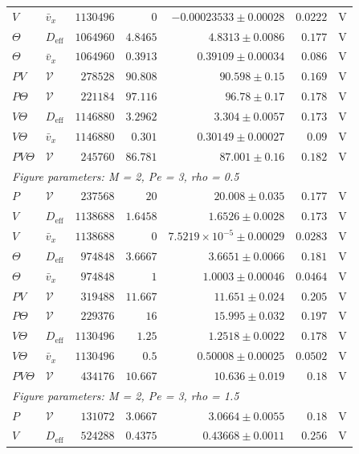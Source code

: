 \begin{longtable}{llrrrrc}
$V$ & $\bar v_x$ & $1130496$ & $0$ & $-0.00023533 \pm 0.00028$ & $0.0222$ & V \\
$\Theta$ & $D_{\mathrm{eff}}$ & $1064960$ & $4.8465$ & $4.8313 \pm 0.0086$ & $0.177$ & V \\
$\Theta$ & $\bar v_x$ & $1064960$ & $0.3913$ & $0.39109 \pm 0.00034$ & $0.086$ & V \\
$PV$ & $\mathcal V$ & $278528$ & $90.808$ & $90.598 \pm 0.15$ & $0.169$ & V \\
$P\Theta$ & $\mathcal V$ & $221184$ & $97.116$ & $96.78 \pm 0.17$ & $0.178$ & V \\
$V\Theta$ & $D_{\mathrm{eff}}$ & $1146880$ & $3.2962$ & $3.304 \pm 0.0057$ & $0.173$ & V \\
$V\Theta$ & $\bar v_x$ & $1146880$ & $0.301$ & $0.30149 \pm 0.00027$ & $0.09$ & V \\
$PV\Theta$ & $\mathcal V$ & $245760$ & $86.781$ & $87.001 \pm 0.16$ & $0.182$ & V \\
\multicolumn{7}{l}{\textit{Figure parameters: M = 2, Pe = 3, rho = 0.5}} \\
$P$ & $\mathcal V$ & $237568$ & $20$ & $20.008 \pm 0.035$ & $0.177$ & V \\
$V$ & $D_{\mathrm{eff}}$ & $1138688$ & $1.6458$ & $1.6526 \pm 0.0028$ & $0.173$ & V \\
$V$ & $\bar v_x$ & $1138688$ & $0$ & $7.5219\times10^{-5} \pm 0.00029$ & $0.0283$ & V \\
$\Theta$ & $D_{\mathrm{eff}}$ & $974848$ & $3.6667$ & $3.6651 \pm 0.0066$ & $0.181$ & V \\
$\Theta$ & $\bar v_x$ & $974848$ & $1$ & $1.0003 \pm 0.00046$ & $0.0464$ & V \\
$PV$ & $\mathcal V$ & $319488$ & $11.667$ & $11.651 \pm 0.024$ & $0.205$ & V \\
$P\Theta$ & $\mathcal V$ & $229376$ & $16$ & $15.995 \pm 0.032$ & $0.197$ & V \\
$V\Theta$ & $D_{\mathrm{eff}}$ & $1130496$ & $1.25$ & $1.2518 \pm 0.0022$ & $0.178$ & V \\
$V\Theta$ & $\bar v_x$ & $1130496$ & $0.5$ & $0.50008 \pm 0.00025$ & $0.0502$ & V \\
$PV\Theta$ & $\mathcal V$ & $434176$ & $10.667$ & $10.636 \pm 0.019$ & $0.18$ & V \\
\multicolumn{7}{l}{\textit{Figure parameters: M = 2, Pe = 3, rho = 1.5}} \\
$P$ & $\mathcal V$ & $131072$ & $3.0667$ & $3.0664 \pm 0.0055$ & $0.18$ & V \\
$V$ & $D_{\mathrm{eff}}$ & $524288$ & $0.4375$ & $0.43668 \pm 0.0011$ & $0.256$ & V \\

\end{longtable}
